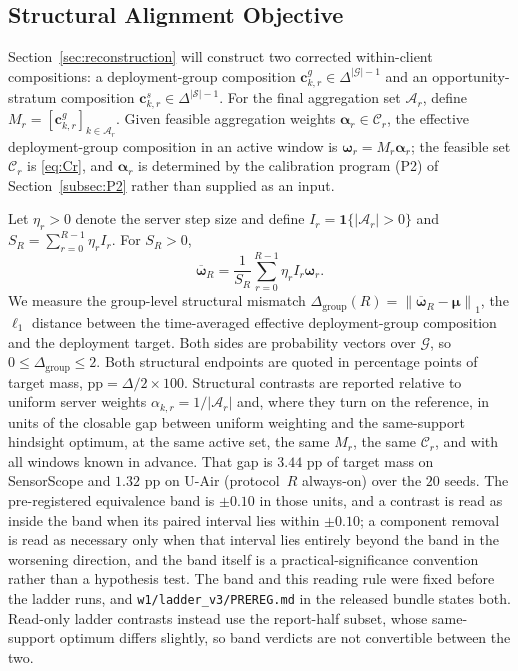 \documentclass[letterpaper,journal]{IEEEtran}
\begin{document}
\subsection{Structural Alignment Objective}
\label{subsec:design_objective}
\label{subsec:equivalence_band}

Section~\ref{sec:reconstruction} will construct two corrected within-client
compositions: a deployment-group composition
$\mathbf{c}^{g}_{k,r}\in\Delta^{|\mathcal{G}|-1}$ and an opportunity-stratum
composition $\mathbf{c}^{s}_{k,r}\in\Delta^{|\mathcal{S}|-1}$.  For the final
aggregation set $\mathcal{A}_r$, define
$M_r=[\mathbf{c}^{g}_{k,r}]_{k\in\mathcal{A}_r}$.  Given feasible aggregation
weights $\boldsymbol\alpha_r\in\mathcal{C}_r$, the effective deployment-group
composition in an active window is $\boldsymbol\omega_r=M_r\boldsymbol\alpha_r$;
the feasible set $\mathcal{C}_r$ is \eqref{eq:Cr}, and $\boldsymbol\alpha_r$ is
determined by the calibration program (P2) of Section~\ref{subsec:P2} rather than
supplied as an input.

Let $\eta_r>0$ denote the server step size and define
$I_r=\mathbf{1}\{|\mathcal{A}_r|>0\}$ and
$S_R=\sum_{r=0}^{R-1}\eta_r I_r$.
For $S_R>0$,
\begin{equation}
    \overline{\boldsymbol\omega}_R
    =
    \frac{1}{S_R}
    \sum_{r=0}^{R-1}
    \eta_r I_r\boldsymbol\omega_r.
    \label{eq:omega_bar}
\end{equation}
We measure the group-level structural mismatch
$\Delta_{\mathrm{group}}(R)=\left\|
\overline{\boldsymbol\omega}_R-\boldsymbol\mu
\right\|_1$,
the $\ell_1$ distance between the time-averaged effective deployment-group
composition and the deployment target.  Both sides are probability vectors
over $\mathcal{G}$, so $0\le\Delta_{\mathrm{group}}\le2$.  Both structural
endpoints are quoted in percentage points of target mass,
$\mathrm{pp}=\Delta/2\times100$.  Structural contrasts are reported relative to
uniform server weights $\alpha_{k,r}=1/|\mathcal{A}_r|$ and, where they turn on
the reference, in units of the closable gap between uniform weighting and the
same-support hindsight optimum, at the same active set, the same $M_r$, the same
$\mathcal{C}_r$, and with all windows known in advance.  That gap is $3.44$ pp of
target mass on SensorScope and $1.32$ pp on U-Air (protocol~$R$ always-on) over
the $20$ seeds.  The pre-registered equivalence band is $\pm0.10$ in those
units, and a contrast is read as inside the band when its paired interval lies
within $\pm0.10$; a component removal is read as necessary only when that
interval lies entirely beyond the band in the worsening direction, and the band
itself is a practical-significance convention rather than a hypothesis test.
The band and this reading rule were fixed before the ladder runs, and
\texttt{w1/ladder\_v3/PREREG.md} in the released bundle states both.
Read-only ladder contrasts instead use the report-half subset, whose
same-support optimum differs slightly, so band verdicts are not convertible
between the two.
\end{document}

